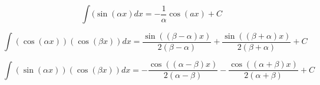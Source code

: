 \documentclass[12pt]{article}
\begin{document}
\begin{equation}
\label{integral sin}
\int (\sin(\alpha x)dx = -\frac{1}{\alpha}\cos(ax) + C
\end{equation}

\begin{equation}
\label{integral cos cos additional}
\int (\cos(\alpha x))(\cos(\beta x))dx = \frac{\sin((\beta-\alpha)x)}{2(\beta-\alpha)} + \frac{\sin((\beta+\alpha)x)}{2(\beta+\alpha)} + C 
\end{equation}

\begin{equation}
\label{integral cos sin additional}
\int (\sin(\alpha x))(\cos(\beta x))dx = -\frac{\cos((\alpha-\beta)x)}{2(\alpha-\beta)} - \frac{\cos((\alpha+\beta)x)}{2(\alpha+\beta)} + C 
\end{equation}
\end{document}
